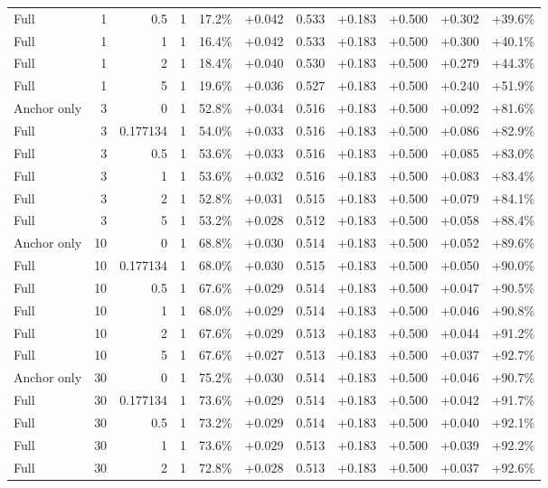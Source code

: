 \begin{table}[htbp]
\begin{tabular}{lrrrccccccc}
Full & 1 & 0.5 & 1 & 17.2\% & +0.042 & 0.533 & +0.183 & +0.500 & +0.302 & +39.6\% \\
Full & 1 & 1 & 1 & 16.4\% & +0.042 & 0.533 & +0.183 & +0.500 & +0.300 & +40.1\% \\
Full & 1 & 2 & 1 & 18.4\% & +0.040 & 0.530 & +0.183 & +0.500 & +0.279 & +44.3\% \\
Full & 1 & 5 & 1 & 19.6\% & +0.036 & 0.527 & +0.183 & +0.500 & +0.240 & +51.9\% \\
Anchor only & 3 & 0 & 1 & 52.8\% & +0.034 & 0.516 & +0.183 & +0.500 & +0.092 & +81.6\% \\
Full & 3 & 0.177134 & 1 & 54.0\% & +0.033 & 0.516 & +0.183 & +0.500 & +0.086 & +82.9\% \\
Full & 3 & 0.5 & 1 & 53.6\% & +0.033 & 0.516 & +0.183 & +0.500 & +0.085 & +83.0\% \\
Full & 3 & 1 & 1 & 53.6\% & +0.032 & 0.516 & +0.183 & +0.500 & +0.083 & +83.4\% \\
Full & 3 & 2 & 1 & 52.8\% & +0.031 & 0.515 & +0.183 & +0.500 & +0.079 & +84.1\% \\
Full & 3 & 5 & 1 & 53.2\% & +0.028 & 0.512 & +0.183 & +0.500 & +0.058 & +88.4\% \\
Anchor only & 10 & 0 & 1 & 68.8\% & +0.030 & 0.514 & +0.183 & +0.500 & +0.052 & +89.6\% \\
Full & 10 & 0.177134 & 1 & 68.0\% & +0.030 & 0.515 & +0.183 & +0.500 & +0.050 & +90.0\% \\
Full & 10 & 0.5 & 1 & 67.6\% & +0.029 & 0.514 & +0.183 & +0.500 & +0.047 & +90.5\% \\
Full & 10 & 1 & 1 & 68.0\% & +0.029 & 0.514 & +0.183 & +0.500 & +0.046 & +90.8\% \\
Full & 10 & 2 & 1 & 67.6\% & +0.029 & 0.513 & +0.183 & +0.500 & +0.044 & +91.2\% \\
Full & 10 & 5 & 1 & 67.6\% & +0.027 & 0.513 & +0.183 & +0.500 & +0.037 & +92.7\% \\
Anchor only & 30 & 0 & 1 & 75.2\% & +0.030 & 0.514 & +0.183 & +0.500 & +0.046 & +90.7\% \\
Full & 30 & 0.177134 & 1 & 73.6\% & +0.029 & 0.514 & +0.183 & +0.500 & +0.042 & +91.7\% \\
Full & 30 & 0.5 & 1 & 73.2\% & +0.029 & 0.514 & +0.183 & +0.500 & +0.040 & +92.1\% \\
Full & 30 & 1 & 1 & 73.6\% & +0.029 & 0.513 & +0.183 & +0.500 & +0.039 & +92.2\% \\
Full & 30 & 2 & 1 & 72.8\% & +0.028 & 0.513 & +0.183 & +0.500 & +0.037 & +92.6\% \\

\end{tabular}
\end{table}
